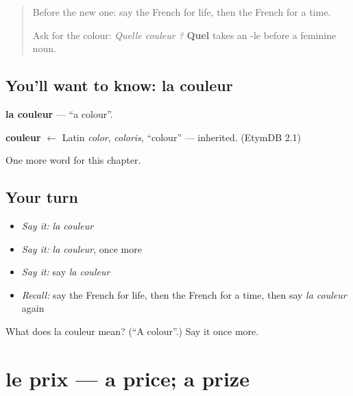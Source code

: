 \label{lesson:FR-C129-couleur}



\begin{quote}
Before the new one: say the French for life, then the French for a time.

Ask for the colour: \emph{Quelle couleur ?} \textbf{Quel} takes an -le before a feminine noun.
\end{quote}

\subsection*{You'll want to know: la couleur}
\textbf{la couleur} — \textquotedblleft{}a colour\textquotedblright{}.

\begin{cousinweb}
\textbf{couleur} $\leftarrow$ Latin \emph{color}, \emph{coloris}, \textquotedblleft{}colour\textquotedblright{} — inherited. (EtymDB 2.1)
\end{cousinweb}

\begin{grammarlens}[title={What you've built}]
One more word for this chapter.
\end{grammarlens}

\subsection*{Your turn}
\begin{itemize}
\raggedright
  \item \emph{Say it:} \emph{la couleur}
  \item \emph{Say it:} \emph{la couleur}, once more
  \item \emph{Say it:} say \emph{la couleur}
  \item \emph{Recall:} say the French for life, then the French for a time, then say \emph{la couleur} again
\end{itemize}

\begin{tcolorbox}[breakable,colback=teal!4,colframe=teal!35!black,title={Before you move on}]
What does la couleur mean? (\textquotedblleft{}A colour\textquotedblright{}.) Say it once more.
\end{tcolorbox}
\section[le prix]{le prix — a price; a prize}

\label{lesson:FR-C129-prix}



